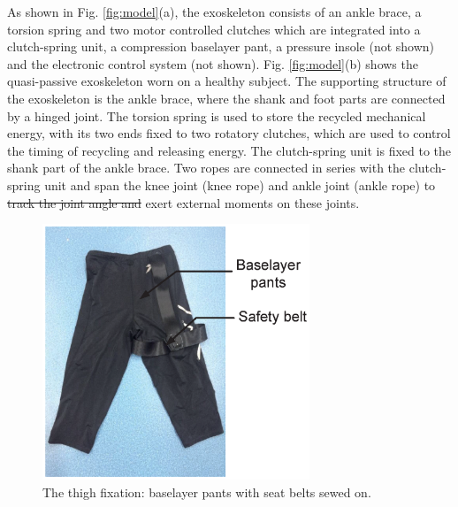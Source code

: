 \documentclass[twocolumn,cleanfoot,10pt]{asme2ej}
\begin{document}
As shown in Fig. \ref{fig:model}(a), the exoskeleton consists of an ankle brace, a torsion spring and two motor controlled clutches which are integrated into a clutch-spring unit, a compression baselayer pant, a pressure insole (not shown) and the electronic control system (not shown).
Fig. \ref{fig:model}(b) shows the quasi-passive exoskeleton worn on a healthy subject.
The supporting structure of the exoskeleton is the ankle brace, where the shank and foot parts are connected by a hinged joint.
The torsion spring is used to store the recycled mechanical energy, with its two ends fixed to two rotatory clutches, which are used to control the timing of recycling and releasing energy.
The clutch-spring unit is fixed to the shank part of the ankle brace.
Two ropes are connected in series with the clutch-spring unit and span the knee joint (knee rope) and ankle joint (ankle rope) to \sout{track the joint angle and }exert external moments on these joints.


\begin{figure}[b]
	\centering
	\includegraphics[width=8cm]{Figure3.eps}
	\caption{The thigh fixation: baselayer pants with seat belts sewed on.}
	\label{fig:pants}   
\end{figure}
\end{document}
